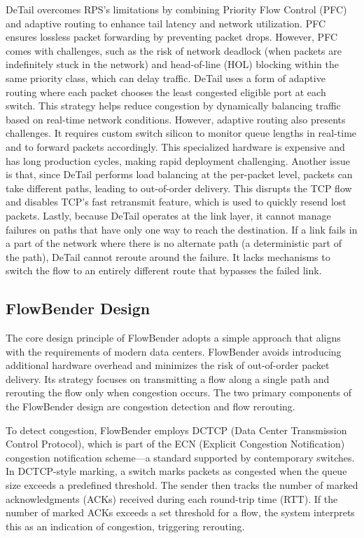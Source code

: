 \documentclass[11pt, sigplan]{acmart}
\begin{document}
DeTail overcomes RPS’s limitations by combining Priority Flow Control (PFC) and adaptive routing to enhance tail latency and network utilization. PFC ensures lossless packet forwarding by preventing packet drops. However, PFC comes with challenges, such as the risk of network deadlock (when packets are indefinitely stuck in the network) and head-of-line (HOL) blocking within the same priority class, which can delay traffic. DeTail uses a form of adaptive routing where each packet chooses the least congested eligible port at each switch. This strategy helps reduce congestion by dynamically balancing traffic based on real-time network conditions. However, adaptive routing also presents challenges. It requires custom switch silicon to monitor queue lengths in real-time and to forward packets accordingly. This specialized hardware is expensive and has long production cycles, making rapid deployment challenging. Another issue is that, since DeTail performs load balancing at the per-packet level, packets can take different paths, leading to out-of-order delivery. This disrupts the TCP flow and disables TCP’s fast retransmit feature, which is used to quickly resend lost packets. Lastly, because DeTail operates at the link layer, it cannot manage failures on paths that have only one way to reach the destination. If a link fails in a part of the network where there is no alternate path (a deterministic part of the path), DeTail cannot reroute around the failure. It lacks mechanisms to switch the flow to an entirely different route that bypasses the failed link.
 

\subsection{FlowBender Design}
The core design principle of FlowBender adopts a simple approach that aligns with the requirements of modern data centers. FlowBender avoids introducing additional hardware overhead and minimizes the risk of out-of-order packet delivery. Its strategy focuses on transmitting a flow along a single path and rerouting the flow only when congestion occurs. The two primary components of the FlowBender design are congestion detection and flow rerouting.

To detect congestion, FlowBender employs DCTCP (Data Center Transmission Control Protocol), which is part of the ECN (Explicit Congestion Notification) congestion notification scheme—a standard supported by contemporary switches. In DCTCP-style marking, a switch marks packets as congested when the queue size exceeds a predefined threshold. The sender then tracks the number of marked acknowledgments (ACKs) received during each round-trip time (RTT). If the number of marked ACKs exceeds a set threshold for a flow, the system interprets this as an indication of congestion, triggering rerouting.
\end{document}
